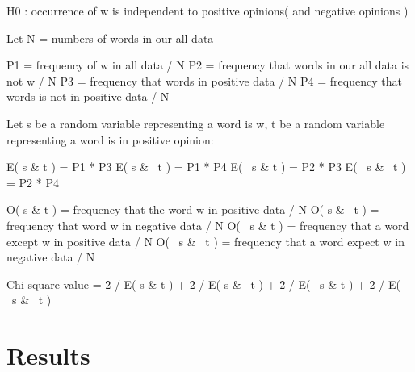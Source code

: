 \documentclass[a4paper]{article}
\begin{document}
\begin{algorithmic}
  \State H0 : occurrence of w is independent to positive opinions( and negative opinions )


  \State Let N = numbers of words in our all data

  \State P1 =  frequency of w in all data / N
  \State P2 =  frequency that words in our all data is not w / N
  \State P3 =  frequency that words in positive data / N
  \State P4 =  frequency that words is not in positive data / N


  \State Let s be a random variable representing a word is w,
  \State t be a random variable representing a word is in positive opinion:
  
  \State E( s \& t ) = P1 * P3
  \State E( s \& ~t ) = P1 * P4
  \State E( ~s \& t ) = P2 * P3
  \State E( ~s \& ~t ) = P2 * P4


  \State O( s \& t ) = frequency that the word w in positive data / N
  \State O( s \& ~t ) = frequency that word w in negative data / N
  \State O( ~s \& t ) = frequency that a word except w in positive data / N
  \State O( ~s \& ~t ) = frequency that a word expect w in negative data / N


  \State Chi-square value = 
  \State [ O( s \& t ) - E( s \& t ) ]\^2 / E( s \& t ) +
  \State [ O( s \& ~t ) - E( s \& ~t ) ]\^2 / E( s \& ~t ) +
  \State [ O( ~s \& t ) - E( ~s \& t ) ]\^2 / E( ~s \& t ) +
  \State [ O( ~s \& ~t ) - E( ~s \& ~t ) ]\^2 / E( ~s \& ~t ) 
\EndFor
\end{algorithmic}

\section{Results}
\end{document}
